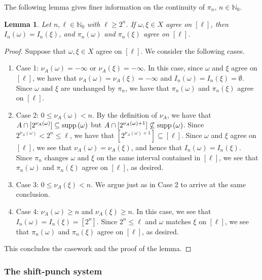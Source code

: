 \documentclass[letter,11pt]{article}
\theoremstyle{plain}
\newtheorem{lemma}[theorem]{Lemma}
\theoremstyle{definition}
\theoremstyle{plain}
\theoremstyle{plain}
\numberwithin{equation}{section}
\newcommand{\supp}{{\normalfont\text{supp}}\,}
\newcommand{\N}{\mathbb{N}}
\renewcommand{\leq}{\leqslant}
\renewcommand{\geq}{\geqslant}
\begin{document}
The following lemma gives finer information on the continuity of $\pi_n$, $n \in \N_0$.

\begin{lemma}
\label{lemma_continuity_of_pins}
    Let $n, \ell \in \N_0$ with $\ell \geq 2^n$.  If $\omega, \xi \in X$ agree on $[\ell]$, then $I_n(\omega) = I_n(\xi)$, and $\pi_n(\omega)$ and $\pi_n(\xi)$ agree on $[\ell]$.
\end{lemma}


\begin{proof}
    Suppose that $\omega, \xi \in X$ agree on $[\ell]$.  We consider the following cases.
    \begin{enumerate}
        \item Case 1: $\nu_A(\omega) = -\infty$ or $\nu_A(\xi) = -\infty$.  In this case, since $\omega$ and $\xi$ agree on $[\ell]$, we have that $\nu_A(\omega) = \nu_A(\xi) = -\infty$ and $I_n(\omega) = I_n(\xi) = \emptyset$.  Since $\omega$ and $\xi$ are unchanged by $\pi_{n}$, we have that $\pi_{n} (\omega)$ and $\pi_{n} (\xi)$ agree on $[\ell]$.

        \item Case 2: $0 \leq \nu_A(\omega) < n$.  By the definition of $\nu_A$, we have that $A \cap [2^{\nu_A(\omega)}] \subseteq \supp(\omega)$ but $A \cap [2^{\nu_A(\omega)+1}] \not\subseteq \supp(\omega)$. Since $2^{\nu_A(\omega)} < 2^{n} \leq \ell$, we have that $[2^{\nu_A(\omega)+1}] \subseteq [\ell]$. Since $\omega$ and $\xi$ agree on $[\ell]$, we see that $\nu_A(\omega) = \nu_A(\xi)$, and hence that $I_n(\omega) = I_n(\xi)$.  Since $\pi_{n}$ changes $\omega$ and $\xi$ on the same interval contained in $[\ell]$, we see that $\pi_{n} (\omega)$ and $\pi_{n} (\xi)$ agree on $[\ell]$, as desired.

        \item Case 3: $0 \leq \nu_A(\xi) < n$. We argue just as in Case 2 to arrive at the same conclusion.

        \item Case 4: $\nu_A(\omega) \geq n$ and $\nu_A(\xi) \geq n$. In this case, we see that $I_n(\omega) = I_n(\xi) = [2^{n}]$.  Since $2^{n} \leq \ell$ and $\omega$ matches $\xi$ on $[\ell]$, we see that $\pi_{n} (\omega)$ and $\pi_{n} (\xi)$ agree on $[\ell]$, as desired.
    \end{enumerate}
    This concludes the casework and the proof of the lemma.
\end{proof}

\subsubsection{The shift-punch system}
\label{sec_punch_system}
\end{document}
